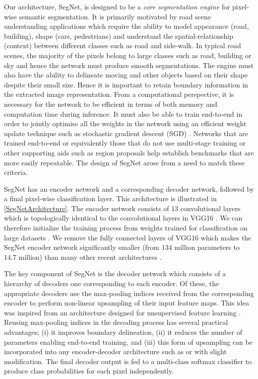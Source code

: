 Our architecture, SegNet, is designed to be a \textit{core segmentation engine} for pixel-wise semantic segmentation. It is primarily motivated by road scene understanding applications which require the ability to model appearance (road, building), shape (cars, pedestrians) and understand the spatial-relationship (context) between different classes such as road and side-walk. In typical road scenes, the majority of the pixels belong to large classes such as road, building or sky and hence the network must produce smooth segmentations. The engine must also have the ability to delineate moving and other objects based on their shape despite their small size. Hence it is important to retain boundary information in the extracted image representation. From a computational perspective, it is necessary for the network to be efficient in terms of both memory and computation time during inference. It must also be able to train end-to-end in order to jointly optimise all the weights in the network using an efficient weight update technique such as stochastic gradient descent (SGD) \citep{Bottou}. Networks that are trained end-to-end or equivalently those that do not use multi-stage training \citep{long2015fully} or other supporting aids such as region proposals \citep{NohDeconvNets} help establish benchmarks that are more easily repeatable. The design of SegNet arose from a need to match these criteria.

SegNet has an encoder network and a corresponding decoder network, followed by a final pixel-wise classification layer. This architecture is illustrated in \cref{SegNetArchitecture}. The encoder network consists of $13$ convolutional layers which is topologically identical to the convolutional layers in VGG16 \citep{simonyan2014very}. We can therefore initialize the training process from weights trained for classification on large datasets \citep{deng2009imagenet}. We remove the fully connected layers of VGG16 which makes the SegNet encoder network significantly smaller (from $134$ million parameters to $14.7$ million) than many other recent architectures \citep{long2015fully,NohDeconvNets,ParseNetRabinovich,DecoupledNet}. 

The key component of SegNet is the decoder network which consists of a hierarchy of decoders one corresponding to each encoder. Of these, the appropriate decoders use the max-pooling indices received from the corresponding encoder to perform non-linear upsampling of their input feature maps. This idea was inspired from an architecture designed for unsupervised feature learning \citep{Ranzato}. Reusing max-pooling indices in the decoding process has several practical advantages; (i) it improves boundary delineation, (ii) it reduces the number of  parameters enabling end-to-end training, and (iii) this form of upsampling can be incorporated into any encoder-decoder architecture such as \citet{long2015fully} or \citet{CRFRNN} with slight modification. The final decoder output is fed to a multi-class softmax classifier to produce class probabilities for each pixel independently.

